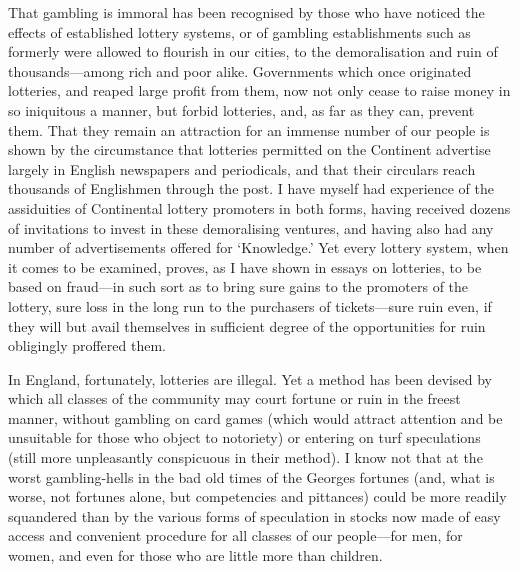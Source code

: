 \documentclass[letterpaper,12pt,oneside,openany]{memoir}
\begin{document}
That gambling is immoral has been recognised by
those who have noticed the effects of established lottery
systems, or of gambling establishments such as formerly
were allowed to flourish in our cities, to the demoralisation
and ruin of thousands---among rich and poor alike.
Governments which once originated lotteries, and
reaped large profit from them, now not only cease to
raise money in so iniquitous a manner, but forbid
lotteries, and, as far as they can, prevent them. That
they remain an attraction for an immense number of
our people is shown by the circumstance that lotteries
permitted on the Continent advertise largely in English
newspapers and periodicals, and that their circulars
reach thousands of Englishmen through the post. I
have myself had experience of the assiduities of Continental
lottery promoters in both forms, having received
dozens of invitations to invest in these demoralising
ventures, and having also had any number of advertisements
offered for `Knowledge.' Yet every
lottery system, when it comes to be examined, proves,
as I have shown in essays on lotteries, to be based on
fraud---in such sort as to bring sure gains to the promoters
of the lottery, sure loss in the long run to the
purchasers of tickets---sure ruin even, if they will but
avail themselves in sufficient degree of the opportunities
for ruin obligingly proffered them.

In England, fortunately, lotteries are illegal. Yet
a method has been devised by which all classes of the
community may court fortune or ruin in the freest
manner, without gambling on card games (which would
attract attention and be unsuitable for those who object
to notoriety) or entering on turf speculations (still more
unpleasantly conspicuous in their method). I know not
that at the worst gambling-hells in the bad old times of
the Georges fortunes (and, what is worse, not fortunes
alone, but competencies and pittances) could be more
readily squandered than by the various forms of speculation
in stocks now made of easy access and convenient
procedure for all classes of our people---for men, for
women, and even for those who are little more than
children.
\end{document}
